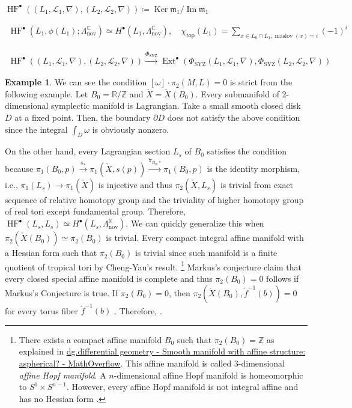 \documentclass[a4paper,dvipdfmx,reqno,12pt]{amsart}
\makeatletter
\newcommand{\ind}[2]{\emph{#1}\index{1{#2}@{#1}}}
\theoremstyle{definition}
\newtheorem{Eg}[Thm]{Example}
\newcommand{\deq}{\coloneqq}
\newcommand{\C}{\mathbb{C}}%
\newcommand{\R}{\mathbb{R}}%
\newcommand{\Z}{\mathbb{Z}}%
\newcommand{\mcal}[1]{\mathcal{#1}}%
\newcommand{\mf}[1]{\mathfrak{#1}}%
\newcommand{\opn}[1]{\operatorname{#1}}
\newcommand{\xto}[1]{\xrightarrow{#1}}
\numberwithin{equation}{section}
\makeatother
\begin{document}
$\opn{HF}^{\bullet}((L_1,\mcal{L}_1,\nabla),(L_2,\mcal{L}_2,\nabla))\deq \opn{Ker}\mf{m}_1/\opn{Im}\mf{m}_1$

\begin{align}
  \opn{HF}^{\bullet}(L_1,\phi(L_1);\Lambda_{\opn{nov}}^{\C})\simeq H^{\bullet}(L_1,\Lambda_{\opn{nov}}^{\C}) , \quad \chi_{\opn{top}}(L_1)=\sum_{x\in L_0\cap L_1, \opn{maslov}(x)=i} (-1)^{i}
\end{align}

\begin{align}
  \opn{HF}^{\bullet}((L_1,\mcal{L}_1,\nabla),(L_2,\mcal{L}_2,\nabla)) \xto{\Phi_{\opn{SYZ}}} \opn{Ext}^{\bullet}(\Phi_{\opn{SYZ}}(L_1,\mcal{L}_1,\nabla) , \Phi_{\opn{SYZ}}(L_2,\mcal{L}_2,\nabla))
\end{align}





\begin{Eg}
  We can see the condition $[\omega]\cdot\pi_2(M,L)=0$ is strict from the following example.
  Let $B_0=\R/\Z$ and
  $\check{X}=\check{X}(B_0)$. Every submanifold of 2-dimensional symplectic manifold is Lagrangian. Take a small smooth closed disk $D$ at a fixed point. Then, the boundary $\partial D$ does not satisfy the above condition since the integral $\int_{D}\omega$ is obviously nonzero.

  On the other hand, every Lagrangian section $L_s$ of $B_0$ satisfies the condition because $\pi_{1}(B_0,p)\xto{s_*} \pi_{1}(\check{X},s(p))\xto{\check{\pi}_{B_0,*}}\pi_{1}(B_0,p)$ is the identity morphism, i.e., $\pi_1(L_s)\to \pi_1(\check{X})$ is injective and thus $\pi_2(\check{X},L_s)$ is trivial from exact sequence of relative homotopy group and the triviality of higher homotopy group of real tori except fundamental group.
  Therefore, $\opn{HF}^{\bullet}(L_s,L_s)\simeq H^{\bullet}(L_s,\Lambda_{\opn{nov}}^{\mathbb{K}})$. We can quickly generalize this when $\pi_2(\check{X}(B_0))\simeq \pi_2(B_0)$ is trivial.
  Every compact integral affine manifold with a Hessian form such that $\pi_2(B_0)$ is trivial since such manifold is a finite quotient of tropical tori by Cheng-Yau's result.
  \footnote{There exists a compact affine manifold $B_0$ such that $\pi_2(B_0)=\Z$ as explained in \href{https://mathoverflow.net/questions/271499/smooth-manifold-with-affine-structure-aspherical}{dg.differential geometry - Smooth manifold with affine structure: aspherical? - MathOverflow}. This affine manifold is called 3-dimensional \ind{affine Hopf manifold}{affine Hopf manifold}. A $n$-dimensional affine Hopf manifold is homeomorphic to $S^{1}\times S^{n-1}$. However, every affine Hopf manifold is not integral affine and has no Hessian form \cite[Corollary 7.3.5]{MR2293045}.}
  Markus's conjecture claim that every closed special affine manifold is complete and thus
  $\pi_2(B_0)=0$ follows if Markus's Conjecture is true.
  If $\pi_2(B_0)=0$, then $\pi_2(\check{X}(B_0),\check{f}^{-1}(b))=0$ for every torus fiber $\check{f}^{-1}(b)$  \cite[Theorem 4.41, Proposition 4.48]{hatcherAlgebraicTopology2002a}.
  Therefore,  \cite{MR4301560}.
\end{Eg}
\end{document}
